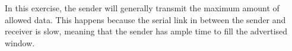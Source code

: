 In this exercise, the sender will generally transmit the maximum amount of allowed data. This happens because the serial link in between the sender and receiver is slow, meaning that the sender has ample time to fill the advertised window.
 